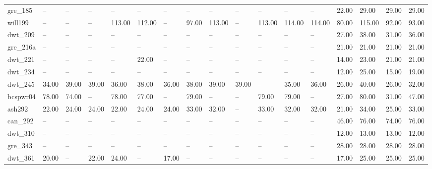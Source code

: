 \begin{tabular}{lllllllllllllllll}
gre\_185 & -- & -- & -- & -- & -- & -- & -- & -- & -- & -- & -- & -- & 22.00 & 29.00 & 29.00 & 29.00 \\
will199 & -- & -- & -- & 113.00 & 112.00 & -- & 97.00 & 113.00 & -- & 113.00 & 114.00 & 114.00 & 80.00 & 115.00 & 92.00 & 93.00 \\
dwt\_209 & -- & -- & -- & -- & -- & -- & -- & -- & -- & -- & -- & -- & 27.00 & 38.00 & 31.00 & 36.00 \\
gre\_216a & -- & -- & -- & -- & -- & -- & -- & -- & -- & -- & -- & -- & 21.00 & 21.00 & 21.00 & 21.00 \\
dwt\_221 & -- & -- & -- & -- & 22.00 & -- & -- & -- & -- & -- & -- & -- & 14.00 & 23.00 & 21.00 & 21.00 \\
dwt\_234 & -- & -- & -- & -- & -- & -- & -- & -- & -- & -- & -- & -- & 12.00 & 25.00 & 15.00 & 19.00 \\
dwt\_245 & 34.00 & 39.00 & 39.00 & 36.00 & 38.00 & 36.00 & 38.00 & 39.00 & 39.00 & -- & 35.00 & 36.00 & 26.00 & 40.00 & 26.00 & 32.00 \\
bcspwr04 & 78.00 & 74.00 & -- & 78.00 & 77.00 & -- & 79.00 & -- & -- & 79.00 & 79.00 & -- & 27.00 & 80.00 & 31.00 & 47.00 \\
ash292 & 22.00 & 24.00 & 24.00 & 22.00 & 24.00 & 24.00 & 33.00 & 32.00 & -- & 33.00 & 32.00 & 32.00 & 21.00 & 34.00 & 25.00 & 33.00 \\
can\_292 & -- & -- & -- & -- & -- & -- & -- & -- & -- & -- & -- & -- & 46.00 & 76.00 & 74.00 & 76.00 \\
dwt\_310 & -- & -- & -- & -- & -- & -- & -- & -- & -- & -- & -- & -- & 12.00 & 13.00 & 13.00 & 12.00 \\
gre\_343 & -- & -- & -- & -- & -- & -- & -- & -- & -- & -- & -- & -- & 28.00 & 28.00 & 28.00 & 28.00 \\
dwt\_361 & 20.00 & -- & 22.00 & 24.00 & -- & 17.00 & -- & -- & -- & -- & -- & -- & 17.00 & 25.00 & 25.00 & 25.00 \\
\hline
\end{tabular}
